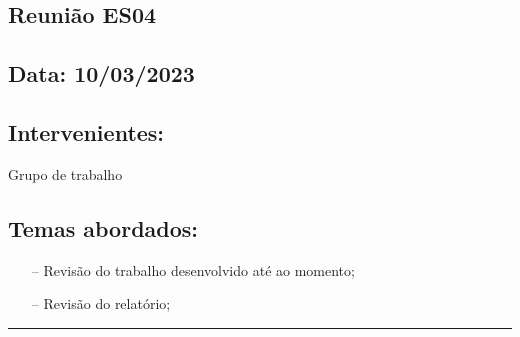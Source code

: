\subsection{Reunião ES04}\label{reuniaoES04}

\subsection*{Data: 10/03/2023}


\subsection*{Intervenientes:}
Grupo de trabalho

\subsection*{Temas abordados:}
\begin{itemize}
\item[--] Revisão do trabalho desenvolvido até ao momento;
\item[--] Revisão do relatório; 
\end{itemize}

\noindent \rule{\linewidth}{0.4pt}
\newline
